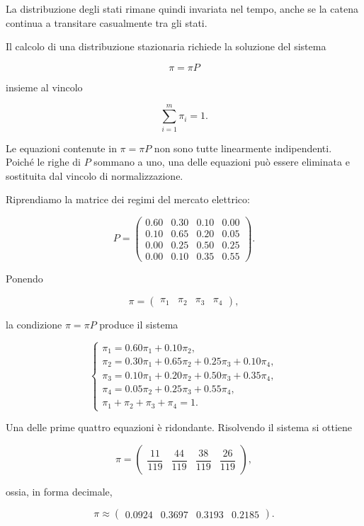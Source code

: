 La distribuzione degli stati rimane quindi invariata nel tempo, anche
se la catena continua a transitare casualmente tra gli stati.

Il calcolo di una distribuzione stazionaria richiede la soluzione del
sistema

\[
\pi=\pi P
\]

insieme al vincolo

\[
\sum_{i=1}^{m}\pi_i=1.
\]

Le equazioni contenute in \(\pi=\pi P\) non sono tutte linearmente
indipendenti. Poich\'{e} le righe di \(P\) sommano a uno, una delle
equazioni pu\`{o} essere eliminata e sostituita dal vincolo di
normalizzazione.

Riprendiamo la matrice dei regimi del mercato elettrico:

\[
P=
\begin{pmatrix}
0.60 & 0.30 & 0.10 & 0.00\\
0.10 & 0.65 & 0.20 & 0.05\\
0.00 & 0.25 & 0.50 & 0.25\\
0.00 & 0.10 & 0.35 & 0.55
\end{pmatrix}.
\]

Ponendo

\[
\pi=
\begin{pmatrix}
\pi_1 & \pi_2 & \pi_3 & \pi_4
\end{pmatrix},
\]

la condizione \(\pi=\pi P\) produce il sistema

\[
\begin{cases}
\pi_1
=
0.60\pi_1+0.10\pi_2,\\
\pi_2
=
0.30\pi_1+0.65\pi_2+0.25\pi_3+0.10\pi_4,\\
\pi_3
=
0.10\pi_1+0.20\pi_2+0.50\pi_3+0.35\pi_4,\\
\pi_4
=
0.05\pi_2+0.25\pi_3+0.55\pi_4,\\
\pi_1+\pi_2+\pi_3+\pi_4=1.
\end{cases}
\]

Una delle prime quattro equazioni \`{e} ridondante. Risolvendo il
sistema si ottiene

\[
\pi
=
\begin{pmatrix}
\dfrac{11}{119}
&
\dfrac{44}{119}
&
\dfrac{38}{119}
&
\dfrac{26}{119}
\end{pmatrix},
\]

ossia, in forma decimale,

\[
\pi
\approx
\begin{pmatrix}
0.0924 & 0.3697 & 0.3193 & 0.2185
\end{pmatrix}.
\]

